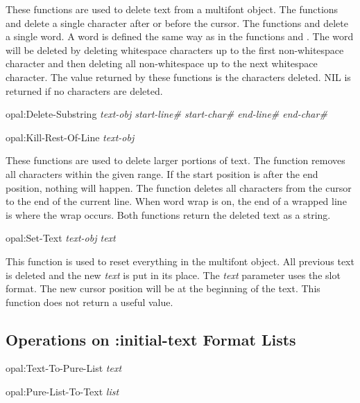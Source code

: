 These functions are used to delete text from a multifont object.  The functions
 and  delete a single character after
or before the cursor.  The functions  and 
delete a single word.  A word is defined the same way as in the functions
 and .  The word will be deleted by
deleting whitespace characters up to the first non-whitespace character and
then deleting all non-whitespace up to the next whitespace character.  The
value returned by these functions is the characters deleted.  {\sc NIL} is returned
if no characters are deleted.

\begin{programexample}
opal:Delete-Substring {\it text-obj start-line\# start-char\# end-line\# end-char\#}\value{function}

opal:Kill-Rest-Of-Line {\it text-obj}\value{function}
\end{programexample}

These functions are used to delete larger portions of text.  The function
 removes all characters within the given range.  If the
start position is after the end position, nothing will happen.  The function
 deletes all characters from the cursor to the end
of the current line.  When word wrap is on, the end of a wrapped line is where
the wrap occurs.  Both functions return the deleted text as a string.

\begin{programexample}
opal:Set-Text {\it text-obj  text}\value{function}
\end{programexample}

This function is used to reset everything in the multifont object.  All
previous text is deleted and the new {\it text} is put in its place.  The
{\it text} parameter uses the  slot format.  The new cursor
position will be at the beginning of the text.  This function does not return
a useful value.


\subsection{Operations on :initial-text Format Lists}

\begin{programexample}
opal:Text-To-Pure-List {\it text}\value{function}

opal:Pure-List-To-Text {\it list}\value{function}
\end{programexample}

